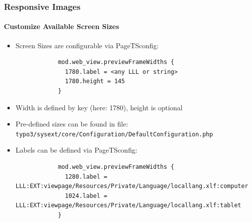 
\begin{frame}[fragile]
	\frametitle{Responsive Images}
	\framesubtitle{Customize Available Screen Sizes}

	\begin{itemize}
		\item Screen Sizes are configurable via PageTSconfig:


		\begin{lstlisting}
			mod.web_view.previewFrameWidths {
			  1780.label = <any LLL or string>
			  1780.height = 145
			}
		\end{lstlisting}

		\item Width is defined by key (here: 1780), height is optional
		\item Pre-defined sizes can be found in file:\newline
			\small\texttt{typo3/sysext/core/Configuration/DefaultConfiguration.php}\normalsize
		\item Labels can be defined via PageTSconfig:

		\begin{lstlisting}
			mod.web_view.previewFrameWidths {
			  1280.label = LLL:EXT:viewpage/Resources/Private/Language/locallang.xlf:computer
			  1024.label = LLL:EXT:viewpage/Resources/Private/Language/locallang.xlf:tablet
			}
		\end{lstlisting}

	\end{itemize}

\end{frame}


